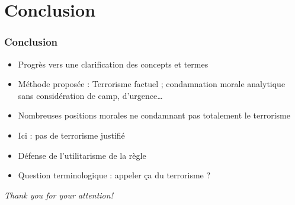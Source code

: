 \documentclass[english, french]{beamer}
\begin{document}
\section{Conclusion}
\begin{frame}
  \frametitle{Conclusion}
  \begin{itemize}
    \item Progrès vers une clarification des concepts et termes
    \item Méthode proposée : Terrorisme factuel ; condamnation morale analytique sans considération de camp, d’urgence…
    \item Nombreuses positions morales ne condamnant pas totalement le terrorisme
    \item Ici : pas de terrorisme justifié
    \item Défense de l’utilitarisme de la règle
    \item Question terminologique : appeler ça du terrorisme ?
  \end{itemize}
\end{frame}

\begin{frame}[plain]
  \addtocounter{framenumber}{-1}
  \begin{center}
    \huge
    \textit{Thank you for your attention!}
  \end{center}
\end{frame}
\end{document}
